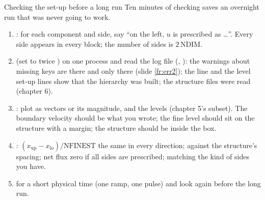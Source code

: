 \documentclass[aspectratio=169,11pt]{beamer}
\begin{document}
\begin{frame}{Checking the set-up before a long run}
\label{fr:check}
\small Ten minutes of checking saves an overnight run that was never going to work.
\begin{enumerate}
  \item {}: for each component and side, say ``on the left, $u$ is prescribed as \ldots''. Every side appears in every block; the number of sides is $2\,\mathrm{NDIM}$.
  \item {} (set  to twice ) on one process and read the log file (, ): the warnings about missing keys are there and only there (slide \ref{fr:err2}); the  line and the level set-up lines show that the hierarchy was built; the structure files were read (chapter 6).
  \item {}: plot  as vectors or its magnitude, and the levels (chapter 5's  subset). The boundary velocity should be what you wrote; the fine level should sit on the structure with a margin; the structure should be inside the box.
  \item {}: $(x_{\mathrm{up}} - x_{\mathrm{lo}})/\mathrm{NFINEST}$ the same in every direction;  against the structure's spacing; net flux zero if all sides are prescribed;  matching the kind of sides you have.
  \item {} for a short physical time (one ramp, one pulse) and look again before the long run.
\end{enumerate}
\end{frame}
\end{document}
